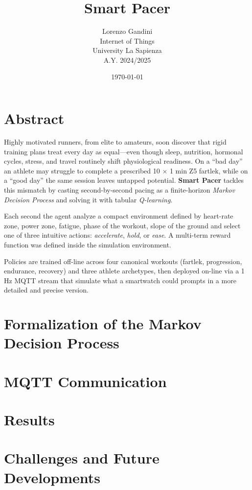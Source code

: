 \documentclass[a4paper,12pt]{article}
\title{Smart Pacer}
\author{Lorenzo Gandini \\ Internet of Things \\ University La Sapienza \\ A.Y. 2024/2025}
\date{\today}
\begin{document}
\maketitle

\newpage

\tableofcontents
\newpage

\section{Abstract}\label{abstract}
Highly motivated runners, from elite to amateurs, soon discover that rigid training plans treat every day as equal—even though sleep, nutrition, hormonal cycles, stress, and travel routinely shift physiological readiness.  On a “bad day” an athlete may struggle to complete a prescribed 10 × 1 min Z5 fartlek, while on a “good day” the same session leaves untapped potential.  
\textbf{Smart Pacer} tackles this mismatch by casting second-by-second pacing as a finite-horizon \emph{Markov Decision Process} and solving it with tabular \emph{Q-learning}. 

Each second the agent analyze a compact environment defined by heart-rate zone, power zone, fatigue, phase of the workout, slope of the ground and select one of three intuitive actions: \emph{accelerate}, \emph{hold}, or \emph{ease}. A multi-term reward function was defined inside the simulation environment.

Policies are trained off-line across four canonical workouts (fartlek, progression, endurance, recovery) and three athlete archetypes, then deployed on-line via a 1 Hz MQTT stream that simulate what a smartwatch could prompts in a more detailed and precise version.


\section{Formalization of the Markov Decision Process}\label{sec:methodology}


\section{MQTT Communication}\label{sec:mqtt-communication}
  

\section{Results}\label{sec:results}


\section{Challenges and Future Developments}\label{sec:challenges-future}

\end{document}
